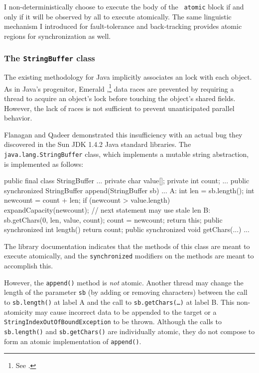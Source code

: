 I non-deterministically choose to execute the body of the {\tt
  atomic} block if and only if it will be observed by all to execute
atomically.  The same linguistic mechanism I introduced for
fault-tolerance and back-tracking provides atomic regions for
synchronization as well.

\subsubsection{The \texttt{StringBuffer} class}\label{sec:stringbuffer}
The existing  methodology for Java
implicitly associates an 
lock with each object.  As in Java's progenitor, Emerald
\cite{BlackHuJuLe86,JulSt91},\footnote{See .}
data races are prevented by
requiring a thread to acquire an
object's lock before touching the object's shared fields.
However, the lack of races is not sufficient to prevent unanticipated
parallel behavior.

Flanagan and Qadeer \cite{FlanaganQa03} demonstrated this
insufficiency with an
actual bug they discovered in the Sun JDK 1.4.2 Java standard
libraries.  The \texttt{java.lang.StringBuffer} class,
which implements a mutable string abstraction, is implemented as follows:
\begin{inlinecode}
public final class StringBuffer ... {
  private char value[];
  private int count;
  ... 
  public synchronized
  StringBuffer append(StringBuffer sb) {
    ...
A:  int len = sb.length();
    int newcount = count + len; 
    if (newcount > value.length)
      expandCapacity(newcount);
    // next statement may use stale len
B:  sb.getChars(0, len, value, count);
    count = newcount;
    return this;
  }
  public synchronized int length() { return count; }
  public synchronized void getChars(...) { ... }
}
\end{inlinecode}

The library documentation indicates that the methods of this class are meant
to execute atomically, and the {\tt synchronized} modifiers on the
methods are meant to accomplish this.

However, the {\tt append()} method is \emph{not} atomic.  Another
thread may change the length of the parameter \texttt{sb} (by adding
or removing characters) between the call to \texttt{sb.length()} at
label A and the call to \texttt{sb.getChars(\ldots)} at label B.
This non-atomicity may cause incorrect data to be appended to the
target or a \texttt{StringIndexOutOfBoundException} to be thrown. 
Although the calls to
\texttt{sb.length()} and \texttt{sb.getChars()} are individually
atomic, they do not compose to form an atomic implementation of
\texttt{append()}.  

